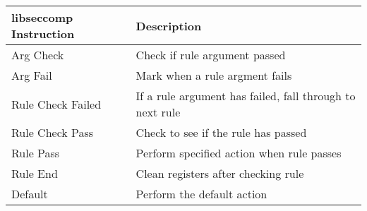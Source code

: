 \begin{tabular}{ll}
\toprule
libseccomp Instruction & Description\\
\midrule
  Arg Check & Check if rule argument passed \\
  Arg Fail & Mark when a rule argment fails \\
  Rule Check Failed & If a rule argument has failed, fall through to next rule \\
  Rule Check Pass & Check to see if the rule has passed \\
  Rule Pass & Perform specified action when rule passes \\
  Rule End & Clean registers after checking rule \\
  Default & Perform the default action \\
\bottomrule
\end{tabular}
